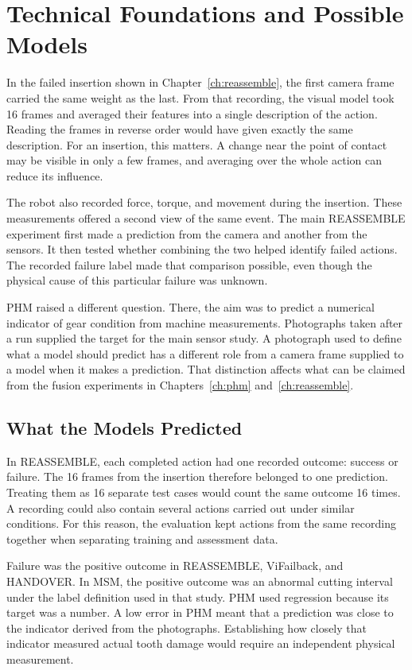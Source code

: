 \chapter{Technical Foundations and Possible Models}
\label{ch:foundations}

In the failed insertion shown in Chapter~\ref{ch:reassemble}, the first camera frame carried the same
weight as the last. From that recording, the visual
model took 16 frames and averaged their features into a single description of the
action. Reading the frames in reverse order would have given exactly the same
description. For an insertion, this matters. A change near the point of contact may be
visible in only a few frames, and averaging over the whole action can reduce its
influence.

The robot also recorded force, torque, and movement during the insertion. These
measurements offered a second view of the same event. The main REASSEMBLE experiment
first made a prediction from the camera and another from the sensors. It then tested
whether combining the two helped identify failed actions. The recorded failure label
made that comparison possible, even though the physical cause of this particular failure
was unknown.

PHM raised a different question. There, the aim was to predict a numerical indicator of
gear condition from machine measurements. Photographs taken after a run supplied the
target for the main sensor study. A photograph used to define what a model should
predict has a different role from a camera frame supplied to a model when it makes a
prediction. That distinction affects what can be claimed from the fusion experiments in
Chapters~\ref{ch:phm} and~\ref{ch:reassemble}.

\section{What the Models Predicted}

In REASSEMBLE, each completed action had one recorded outcome: success or failure. The
16 frames from the insertion therefore belonged to one prediction. Treating
them as 16 separate test cases would count the same outcome 16 times. A recording could
also contain several actions carried out under similar conditions. For this reason, the
evaluation kept actions from the same recording together when separating training and
assessment data.

Failure was the positive outcome in REASSEMBLE, ViFailback, and HANDOVER. In MSM, the
positive outcome was an abnormal cutting interval under the label definition used in
that study. PHM used regression because its target was a number. A low error in PHM
meant that a prediction was close to the indicator derived from the photographs.
Establishing how closely that indicator measured actual tooth damage would require an
independent physical measurement.

